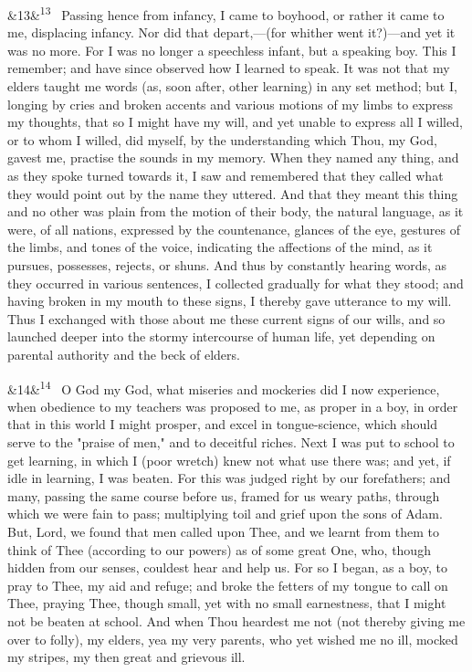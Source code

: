 \documentclass[12pt]{article}
\newcommand{\para}[1][]{\par\noindent\ifx&#1&\else\textsuperscript{\footnotesize #1}~\fi}
\begin{document}
\para[13] Passing hence from infancy, I came to boyhood, or rather it came to me, displacing infancy. Nor did that depart,---(for whither went it?)---and yet it was no more. For I was no longer a speechless infant, but a speaking boy. This I remember; and have since observed how I learned to speak. It was not that my elders taught me words (as, soon after, other learning) in any set method; but I, longing by cries and broken accents and various motions of my limbs to express my thoughts, that so I might have my will, and yet unable to express all I willed, or to whom I willed, did myself, by the understanding which Thou, my God, gavest me, practise the sounds in my memory. When they named any thing, and as they spoke turned towards it, I saw and remembered that they called what they would point out by the name they uttered. And that they meant this thing and no other was plain from the motion of their body, the natural language, as it were, of all nations, expressed by the countenance, glances of the eye, gestures of the limbs, and tones of the voice, indicating the affections of the mind, as it pursues, possesses, rejects, or shuns. And thus by constantly hearing words, as they occurred in various sentences, I collected gradually for what they stood; and having broken in my mouth to these signs, I thereby gave utterance to my will. Thus I exchanged with those about me these current signs of our wills, and so launched deeper into the stormy intercourse of human life, yet depending on parental authority and the beck of elders.

\para[14] O God my God, what miseries and mockeries did I now experience, when obedience to my teachers was proposed to me, as proper in a boy, in order that in this world I might prosper, and excel in tongue-science, which should serve to the "praise of men," and to deceitful riches. Next I was put to school to get learning, in which I (poor wretch) knew not what use there was; and yet, if idle in learning, I was beaten. For this was judged right by our forefathers; and many, passing the same course before us, framed for us weary paths, through which we were fain to pass; multiplying toil and grief upon the sons of Adam. But, Lord, we found that men called upon Thee, and we learnt from them to think of Thee (according to our powers) as of some great One, who, though hidden from our senses, couldest hear and help us. For so I began, as a boy, to pray to Thee, my aid and refuge; and broke the fetters of my tongue to call on Thee, praying Thee, though small, yet with no small earnestness, that I might not be beaten at school. And when Thou heardest me not (not thereby giving me over to folly), my elders, yea my very parents, who yet wished me no ill, mocked my stripes, my then great and grievous ill.
\end{document}
